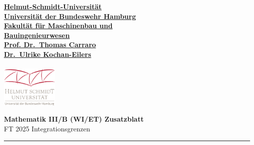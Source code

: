 \documentclass[10pt,landscape,fleqn]{article}
\begin{document}
\begin{twocolumn}



\href{http://mb-mathe.hsu-hh.de/bause}
{\large\bf Helmut-Schmidt-Universit\"at}\\
\href{http://mb-mathe.hsu-hh.de/bause}
{\large\bf Universit\"at der Bundeswehr Hamburg}\\
\href{http://mb-mathe.hsu-hh.de/bause}
{\large\bf Fakult\"at f\"ur Maschinenbau und \\ Bauingenieurwesen}\\[1ex]
\href{http://mb-mathe.hsu-hh.de/bause}
{\large\bf Prof. Dr.\ Thomas Carraro}\\
\href{http://mb-mathe.hsu-hh.de/bause}
{\large\bf Dr.\ Ulrike Kochan-Eilers}\\
\\[-28mm]
\phantom{.}
\hfill\includegraphics[height=20mm]{HSU_RGB}

\vspace*{8mm}
{\Large\bf Mathematik III/B (WI/ET) \hfill Zusatzblatt}\\[1ex]
{\Large FT 2025 \hfill  Integrationsgrenzen}


\vspace*{1mm}
\rule{360pt}{2pt}

\vspace*{0ex}
%

% 





\end{twocolumn}
\end{document}
